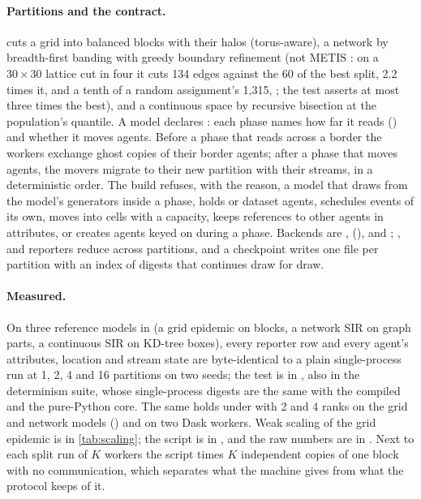 \paragraph{Partitions and the contract.}  cuts a grid into balanced
blocks with their halos (torus-aware), a network by breadth-first banding with greedy boundary
refinement (not METIS \citep{karypis1998fast}: on a $30 \times 30$ lattice cut in four it cuts 134
edges against the 60 of the best split, 2.2 times it, and a tenth of a random assignment's
1,315, ; the test asserts at most three times the best), and
a continuous space by recursive bisection at the population's quantile. A model declares :
each phase names how far it reads () and whether it moves agents. Before a phase
that reads across a border the workers exchange ghost copies of their border agents; after a
phase that moves agents, the movers migrate to their new partition with their streams, in a
deterministic order. The build refuses, with the reason, a model that draws from the model's
generators inside a phase, holds  or dataset agents, schedules events of its own,
moves into cells with a capacity, keeps references to other agents in attributes, or creates
agents keyed on  during a phase. Backends are , 
(),  and ; ,  and  reporters
reduce across partitions, and a checkpoint writes one file per partition with an index of
digests that  continues draw for draw.

\paragraph{Measured.} On three reference models in  (a
grid epidemic on blocks, a network SIR on graph parts, a continuous SIR on KD-tree boxes), every
reporter row and every agent's attributes, location and stream state are byte-identical to a
plain single-process run at 1, 2, 4 and 16 partitions on two seeds; the test is
 in , also in the determinism suite, whose
single-process digests are the same with the compiled and the pure-Python core. The same holds
under  with 2 and 4 ranks on the grid and network models () and
on two Dask workers. Weak scaling of the grid epidemic is in \cref{tab:scaling}; the
script is  in , and the raw numbers are in
. Next to each split run of $K$ workers the script times $K$ independent copies of one block with
no communication, which separates what the machine gives from what the protocol keeps of it.

